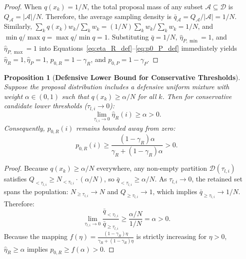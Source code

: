 \documentclass[11pt,a4paper]{article}
\newtheorem{proposition}[theorem]{Proposition}
\begin{document}
\begin{proof}
When $q(x_k) = 1/N$, the total proposal mass of any subset $\mathcal{A} \subseteq \mathcal{D}$ is $Q_{\mathcal{A}} = |\mathcal{A}| / N$. Therefore, the average sampling density is $\bar{q}_{\mathcal{A}} = Q_{\mathcal{A}} / |\mathcal{A}| = 1/N$. Similarly, $\sum_{k} q(x_k) w_k / \sum_k w_k = (1/N) \sum_k w_k / \sum_k w_k = 1/N$, and $\min q / \max q = \max q / \min q = 1$. Substituting $\bar{q} = 1/N$, $\hat{\eta}_{P, \min} = 1$, and $\hat{\eta}_{P, \max} = 1$ into Equations~\eqref{eq:eta_R_def}--\eqref{eq:p0_P_def} immediately yields $\hat{\eta}_R = 1, \hat{\eta}_P = 1$, $p_{0, R} = 1 - \gamma_R$, and $p_{0, P} = 1 - \gamma_P$.
\end{proof}


\begin{proposition}[\textbf{Defensive Lower Bound for Conservative Thresholds}]\label{prop:defensive_lower_bound}
Suppose the proposal distribution includes a defensive uniform mixture with weight $\alpha \in (0, 1)$ such that $q(x_k) \ge \alpha / N$ for all $k$. Then for conservative candidate lower thresholds ($\tau_{l, i} \to 0$):
\begin{equation}
\lim_{\tau_{l, i} \to 0} \hat{\eta}_R(i) \ge \alpha > 0.
\end{equation}
Consequently, $p_{0, R}(i)$ remains bounded away from zero:
\begin{equation}
p_{0, R}(i) \ge \frac{(1 - \gamma_R)\alpha}{\gamma_R + (1 - \gamma_R)\alpha} > 0.
\end{equation}
\end{proposition}

\begin{proof}
Because $q(x_k) \ge \alpha / N$ everywhere, any non-empty partition $\mathcal{D}(\tau_{l, i})$ satisfies $Q_{< \tau_{l, i}} \ge N_{< \tau_{l, i}} \cdot (\alpha / N)$, so $\bar{q}_{< \tau_{l, i}} \ge \alpha / N$.
As $\tau_{l, i} \to 0$, the retained set spans the population: $N_{\ge \tau_{l, i}} \to N$ and $Q_{\ge \tau_{l, i}} \to 1$, which implies $\bar{q}_{\ge \tau_{l, i}} \to 1/N$.
Therefore:
\begin{equation}
\lim_{\tau_{l, i} \to 0} \frac{\bar{q}_{< \tau_{l, i}}}{\bar{q}_{\ge \tau_{l, i}}} \ge \frac{\alpha / N}{1 / N} = \alpha > 0.
\end{equation}
Because the mapping $f(\eta) = \frac{(1 - \gamma_R)\eta}{\gamma_R + (1 - \gamma_R)\eta}$ is strictly increasing for $\eta > 0$, $\hat{\eta}_R \ge \alpha$ implies $p_{0, R} \ge f(\alpha) > 0$.
\end{proof}
\end{document}
